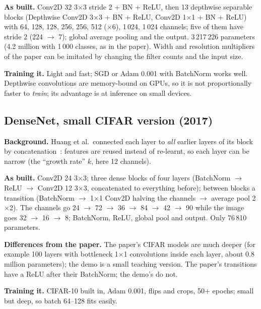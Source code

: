 \documentclass[11pt,a4paper]{article}
\begin{document}
\textbf{As built.} Conv2D 32 3$\times$3 stride 2 + BN + ReLU, then 13 depthwise separable blocks (Depthwise Conv2D 3$\times$3 + BN +
ReLU, Conv2D 1$\times$1 + BN + ReLU) with 64, 128, 128, 256, 256, 512 ($\times$6), 1\,024, 1\,024 channels; five of them have stride 2
(224 $\rightarrow$ 7); global average pooling and the output. 3\,217\,226 parameters (4.2 million with 1\,000 classes, as in the paper).
Width and resolution multipliers of the paper can be imitated by changing the filter counts and the input size.

\textbf{Training it.} Light and fast; SGD or Adam 0.001 with BatchNorm works well. Depthwise convolutions are memory-bound on GPUs, so
it is not proportionally faster to \emph{train}; its advantage is at inference on small devices.

\subsection{DenseNet, small CIFAR version (2017)}
\textbf{Background.} Huang et al.\ connected each layer to \emph{all} earlier layers of its block by concatenation~\cite{huang2016densenet}:
features are reused instead of re-learnt, so each layer can be narrow (the ``growth rate'' $k$, here 12 channels).

\textbf{As built.} Conv2D 24 3$\times$3; three dense blocks of four layers (BatchNorm $\rightarrow$ ReLU $\rightarrow$ Conv2D 12
3$\times$3, concatenated to everything before); between blocks a transition (BatchNorm $\rightarrow$ 1$\times$1 Conv2D halving the
channels $\rightarrow$ average pool 2$\times$2). The channels go 24 $\rightarrow$ 72 $\rightarrow$ 36 $\rightarrow$ 84 $\rightarrow$ 42
$\rightarrow$ 90 while the image goes 32 $\rightarrow$ 16 $\rightarrow$ 8; BatchNorm, ReLU, global pool and output. Only 76\,810 parameters.

\textbf{Differences from the paper.} The paper's CIFAR models are much deeper (for example 100 layers with bottleneck 1$\times$1
convolutions inside each layer, about 0.8 million parameters); the demo is a small teaching version. The paper's transitions have a ReLU
after their BatchNorm; the demo's do not.

\textbf{Training it.} CIFAR-10 built in, Adam 0.001, flips and crops, 50+ epochs; small but deep, so batch 64--128 fits easily.

\end{document}

